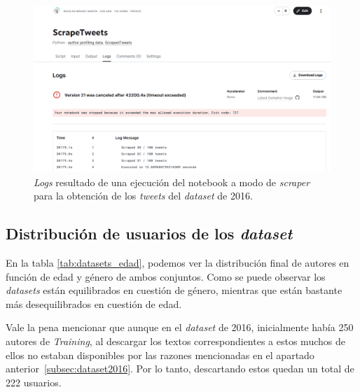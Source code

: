  \noindent\begin{figure}[hp!]
  \centering
    \includegraphics[width=\textwidth]{imaxes/scraper.png}
  \caption{\textit{Logs} resultado de una ejecución del notebook a modo de \textit{scraper} para la obtención de los \textit{tweets} del \textit{dataset} de 2016.}
  \label{fig:scraper}
\end{figure}
 
   \subsection{Distribución de usuarios de los \textit{dataset}}

   En la tabla \ref{tab:datasets_edad}, podemos ver la distribución final de autores en función de edad y género de ambos conjuntos. Como se puede observar los \textit{datasets} están equilibrados en cuestión de género, mientras que están bastante más desequilibrados en cuestión de edad.
   
   Vale la pena mencionar que aunque en el \textit{dataset} de 2016, inicialmente había 250 autores de \textit{Training}, al descargar los textos correspondientes a estos muchos de ellos no estaban disponibles por las razones mencionadas en el apartado anterior~\ref{subsec:dataset2016}. Por lo tanto, descartando estos quedan un total de 222 usuarios.
   
